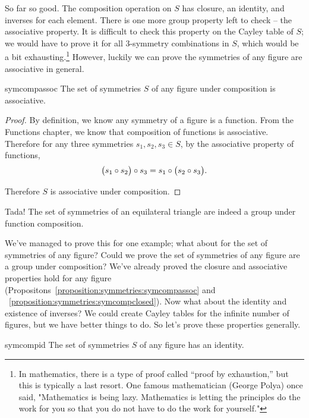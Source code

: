 So far so good.  The composition operation on $S$ has closure, an identity, and inverses for each element.  There is one more group property left to check -- the associative property. It is difficult to check this property on the Cayley table of $S$; we would have to prove it for all 3-symmetry combinations in $S$, which would be a bit exhausting.\footnote{In mathematics, there is a type of proof called ``proof by exhaustion,'' but this is typically a last resort. One famous mathematician (George Polya) once said, "Mathematics is being lazy. Mathematics is letting the principles do the work for you so that you do not have to do the work for yourself."}  
However, luckily we can prove the symmetries of any figure are associative in general.

\begin{prop}{symcompassoc}
The set of symmetries $S$ of any figure under composition is associative.
\end{prop}

\begin{proof}
By definition, we know any symmetry of a figure is a function.  From the Functions chapter, we know that composition of functions is associative.  Therefore for any three symmetries $s_1, s_2, s_3 \in S$, by the associative property of functions, 
\[ \bigl( s_1 \circ s_2 \bigr) \circ s_3 = s_1 \circ \bigl( s_2 \circ s_3 \bigr). \]

\noindent
Therefore $S$ is associative under composition.
\end{proof}
\medskip

Tada!  The set of symmetries of an equilateral triangle are indeed a group under function composition.  
\medskip

We've managed to prove this for one example; what about for the set of symmetries of any figure?  Could we prove the set of symmetries of any figure are a group under composition?  We've already proved the closure and associative properties hold for any figure (Propositons~\ref{proposition:symmetries:symcompassoc} and ~\ref{proposition:symmetries:symcompclosed}).  Now what about the identity and existence of inverses?  We could create Cayley tables for the infinite number of figures, but we have better things to do.  So let's prove these properties generally.  

\begin{prop}{symcompid}
The set of symmetries $S$ of any figure has an identity.
\end{prop}


